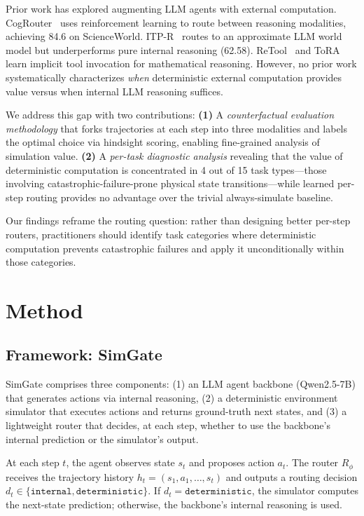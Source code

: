 \documentclass[11pt,a4paper]{article}
\begin{document}
Prior work has explored augmenting LLM agents with external computation.
CogRouter~\cite{qiao2024cogrouter} uses reinforcement learning to route between reasoning modalities, achieving 84.6 on ScienceWorld.
ITP-R~\cite{lu2024itpr} routes to an approximate LLM world model but underperforms pure internal reasoning (62.58).
ReTool~\cite{feng2024retool} and ToRA~\cite{gou2024tora} learn implicit tool invocation for mathematical reasoning.
However, no prior work systematically characterizes \emph{when} deterministic external computation provides value versus when internal LLM reasoning suffices.

We address this gap with two contributions:
\textbf{(1)} A \emph{counterfactual evaluation methodology} that forks trajectories at each step into three modalities and labels the optimal choice via hindsight scoring, enabling fine-grained analysis of simulation value.
\textbf{(2)} A \emph{per-task diagnostic analysis} revealing that the value of deterministic computation is concentrated in 4 out of 15 task types---those involving catastrophic-failure-prone physical state transitions---while learned per-step routing provides no advantage over the trivial always-simulate baseline.

Our findings reframe the routing question: rather than designing better per-step routers, practitioners should identify task categories where deterministic computation prevents catastrophic failures and apply it unconditionally within those categories.

\section{Method}

\subsection{Framework: SimGate}

SimGate comprises three components: (1) an LLM agent backbone (Qwen2.5-7B) that generates actions via internal reasoning, (2) a deterministic environment simulator that executes actions and returns ground-truth next states, and (3) a lightweight router that decides, at each step, whether to use the backbone's internal prediction or the simulator's output.

At each step $t$, the agent observes state $s_t$ and proposes action $a_t$. The router $R_\phi$ receives the trajectory history $h_t = (s_1, a_1, \ldots, s_t)$ and outputs a routing decision $d_t \in \{\texttt{internal}, \texttt{deterministic}\}$. If $d_t = \texttt{deterministic}$, the simulator computes the next-state prediction; otherwise, the backbone's internal reasoning is used.
\end{document}
